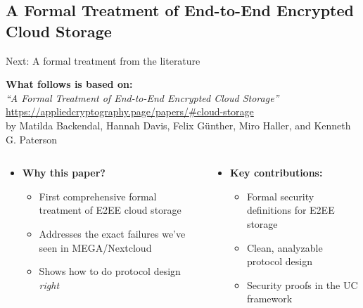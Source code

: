 \documentclass[aspectratio=169, lualatex, handout]{beamer}
\begin{document}
\subsection{A Formal Treatment of End-to-End Encrypted Cloud Storage}

\begin{frame}{Next: A formal treatment from the literature}
	\begin{center}
		\textbf{What follows is based on:}\\
		\vspace{0.3cm}
		\textit{``A Formal Treatment of End-to-End Encrypted Cloud Storage''}\\
		{\tiny\url{https://appliedcryptography.page/papers/\#cloud-storage}}\\
		\vspace{0.2cm}
		{\small by Matilda Backendal, Hannah Davis, Felix Günther, Miro Haller, and Kenneth G. Paterson}
	\end{center}
	\begin{columns}[t]
		\begin{column}{0.5\textwidth}
			\begin{itemize}
				\item \textbf{Why this paper?}
				      \begin{itemize}
					      \item First comprehensive formal treatment of E2EE cloud storage
					      \item Addresses the exact failures we've seen in MEGA/Nextcloud
					      \item Shows how to do protocol design \textit{right}
				      \end{itemize}
			\end{itemize}
		\end{column}
		\begin{column}{0.5\textwidth}
			\begin{itemize}
				\item \textbf{Key contributions:}
				      \begin{itemize}
					      \item Formal security definitions for E2EE storage
					      \item Clean, analyzable protocol design
					      \item Security proofs in the UC framework
				      \end{itemize}
			\end{itemize}
		\end{column}
	\end{columns}
\end{frame}
\end{document}
